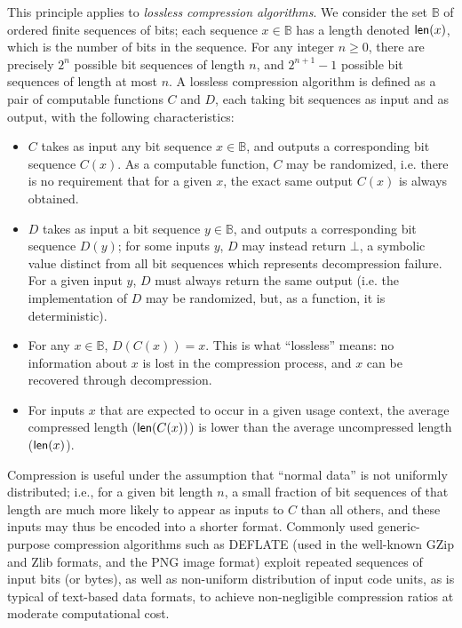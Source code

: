 \documentclass{llncs}
\newcommand{\bB}{\mathbb{B}}
\newcommand{\bitlength}{\text{\textsf{len}}}
\begin{document}
This principle applies to \emph{lossless compression algorithms}. We
consider the set $\bB$ of ordered finite sequences of bits; each
sequence $x \in \bB$ has a length denoted $\bitlength(x)$, which is the
number of bits in the sequence. For any integer $n \geq 0$, there are
precisely $2^n$ possible bit sequences of length $n$, and $2^{n+1}-1$
possible bit sequences of length at most $n$. A lossless compression
algorithm is defined as a pair of computable functions $C$ and $D$, each
taking bit sequences as input and as output, with the following
characteristics:
\begin{itemize}

    \item $C$ takes as input any bit sequence $x \in \bB$, and outputs
    a corresponding bit sequence $C(x)$. As a computable function, $C$
    may be randomized, i.e. there is no requirement that for a given $x$,
    the exact same output $C(x)$ is always obtained.

    \item $D$ takes as input a bit sequence $y \in \bB$, and outputs a
    corresponding bit sequence $D(y)$; for some inputs $y$, $D$ may
    instead return $\bot$, a symbolic value distinct from all bit
    sequences which represents decompression failure. For a given input
    $y$, $D$ must always return the same output (i.e. the implementation
    of $D$ may be randomized, but, as a function, it is deterministic).

    \item For any $x \in \bB$, $D(C(x)) = x$. This is what ``lossless''
    means: no information about $x$ is lost in the compression process,
    and $x$ can be recovered through decompression.

    \item For inputs $x$ that are expected to occur in a given usage
    context, the average compressed length ($\bitlength(C(x))$) is
    lower than the average uncompressed length ($\bitlength(x)$).

\end{itemize}

Compression is useful under the assumption that ``normal data'' is not
uniformly distributed; i.e., for a given bit length $n$, a small
fraction of bit sequences of that length are much more likely to appear
as inputs to $C$ than all others, and these inputs may thus be encoded
into a shorter format. Commonly used generic-purpose compression
algorithms such as DEFLATE\cite{DEFLATErfc1951} (used in the well-known
GZip and Zlib formats, and the PNG image format) exploit repeated
sequences of input bits (or bytes), as well as non-uniform distribution
of input code units, as is typical of text-based data formats, to
achieve non-negligible compression ratios at moderate computational
cost.
\end{document}
